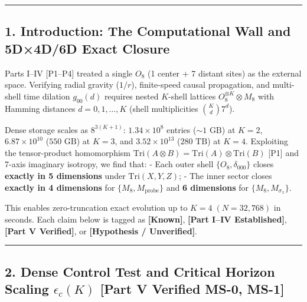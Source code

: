 \documentclass[
  a4paper,
]{article}
\begin{document}
\begin{center}\rule{0.5\linewidth}{0.5pt}\end{center}

\subsection{1. Introduction: The Computational Wall and 5D×4D/6D Exact
Closure}\label{introduction-the-computational-wall-and-5d4d6d-exact-closure}

Parts I--IV {[}P1--P4{]} treated a single \(O_8\) (1 center + 7 distant
sites) as the external space. Verifying radial gravity (\(1/r\)),
finite-speed causal propagation, and multi-shell time dilation
\(g_{00}(d)\) requires nested \(K\)-shell lattices
\(O_8^{\otimes K} \otimes M_8\) with Hamming distances
\(d = 0, 1, \dots, K\) (shell multiplicities \(\binom{K}{d} 7^d\)).

Dense storage scales as \(8^{3(K+1)}\): \(1.34\times 10^8\) entries
(\(\sim 1\text{ GB}\)) at \(K=2\), \(6.87\times 10^{10}\)
(\(550\text{ GB}\)) at \(K=3\), and \(3.52\times 10^{13}\)
(\(280\text{ TB}\)) at \(K=4\). Exploiting the tensor-product
homomorphism
\(\mathrm{Tri}(A\otimes B)=\mathrm{Tri}(A)\otimes\mathrm{Tri}(B)\)
{[}P1{]} and 7-axis imaginary isotropy, we find that: - Each outer shell
\(\{O_8, \delta_{000}\}\) closes \textbf{exactly in 5 dimensions} under
\(\mathrm{Tri}(X,Y,Z)\); - The inner sector closes \textbf{exactly in 4
dimensions} for \(\{M_8, M_{\mathrm{probe}}\}\) and \textbf{6
dimensions} for \(\{M_8, M_{\sigma_x}\}\).

This enables zero-truncation exact evolution up to \(K=4\;(N=32{,}768)\)
in seconds. Each claim below is tagged as \textbf{{[}Known{]}},
\textbf{{[}Part I--IV Established{]}}, \textbf{{[}Part V Verified{]}},
or \textbf{{[}Hypothesis / Unverified{]}}.

\begin{center}\rule{0.5\linewidth}{0.5pt}\end{center}

\subsection{\texorpdfstring{2. Dense Control Test and Critical Horizon
Scaling \(\epsilon_c(K)\) {[}Part V Verified MS-0,
MS-1{]}}{2. Dense Control Test and Critical Horizon Scaling \textbackslash epsilon\_c(K) {[}Part V Verified MS-0, MS-1{]}}}\label{dense-control-test-and-critical-horizon-scaling-epsilon_ck-part-v-verified-ms-0-ms-1}
\end{document}
